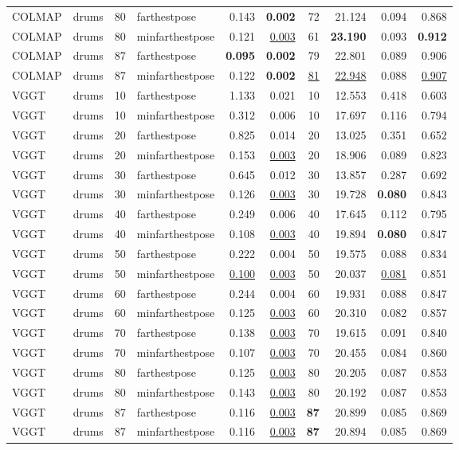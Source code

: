 \begin{table}[H]
\begin{tabular}{llrlrrrrrr}
COLMAP & drums & 80 & farthestpose & 0.143 & \textbf{0.002} & 72 & 21.124 & 0.094 & 0.868 \\
COLMAP & drums & 80 & minfarthestpose & 0.121 & \underline{0.003} & 61 & \textbf{23.190} & 0.093 & \textbf{0.912} \\
COLMAP & drums & 87 & farthestpose & \textbf{0.095} & \textbf{0.002} & 79 & 22.801 & 0.089 & 0.906 \\
COLMAP & drums & 87 & minfarthestpose & 0.122 & \textbf{0.002} & \underline{81} & \underline{22.948} & 0.088 & \underline{0.907} \\
VGGT & drums & 10 & farthestpose & 1.133 & 0.021 & 10 & 12.553 & 0.418 & 0.603 \\
VGGT & drums & 10 & minfarthestpose & 0.312 & 0.006 & 10 & 17.697 & 0.116 & 0.794 \\
VGGT & drums & 20 & farthestpose & 0.825 & 0.014 & 20 & 13.025 & 0.351 & 0.652 \\
VGGT & drums & 20 & minfarthestpose & 0.153 & \underline{0.003} & 20 & 18.906 & 0.089 & 0.823 \\
VGGT & drums & 30 & farthestpose & 0.645 & 0.012 & 30 & 13.857 & 0.287 & 0.692 \\
VGGT & drums & 30 & minfarthestpose & 0.126 & \underline{0.003} & 30 & 19.728 & \textbf{0.080} & 0.843 \\
VGGT & drums & 40 & farthestpose & 0.249 & 0.006 & 40 & 17.645 & 0.112 & 0.795 \\
VGGT & drums & 40 & minfarthestpose & 0.108 & \underline{0.003} & 40 & 19.894 & \textbf{0.080} & 0.847 \\
VGGT & drums & 50 & farthestpose & 0.222 & 0.004 & 50 & 19.575 & 0.088 & 0.834 \\
VGGT & drums & 50 & minfarthestpose & \underline{0.100} & \underline{0.003} & 50 & 20.037 & \underline{0.081} & 0.851 \\
VGGT & drums & 60 & farthestpose & 0.244 & 0.004 & 60 & 19.931 & 0.088 & 0.847 \\
VGGT & drums & 60 & minfarthestpose & 0.125 & \underline{0.003} & 60 & 20.310 & 0.082 & 0.857 \\
VGGT & drums & 70 & farthestpose & 0.138 & \underline{0.003} & 70 & 19.615 & 0.091 & 0.840 \\
VGGT & drums & 70 & minfarthestpose & 0.107 & \underline{0.003} & 70 & 20.455 & 0.084 & 0.860 \\
VGGT & drums & 80 & farthestpose & 0.125 & \underline{0.003} & 80 & 20.205 & 0.087 & 0.853 \\
VGGT & drums & 80 & minfarthestpose & 0.143 & \underline{0.003} & 80 & 20.192 & 0.087 & 0.853 \\
VGGT & drums & 87 & farthestpose & 0.116 & \underline{0.003} & \textbf{87} & 20.899 & 0.085 & 0.869 \\
VGGT & drums & 87 & minfarthestpose & 0.116 & \underline{0.003} & \textbf{87} & 20.894 & 0.085 & 0.869 \\
\bottomrule
\end{tabular}
\end{table}